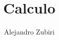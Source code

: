 \documentclass{report}
\author{Alejandro Zubiri}
\title{Calculo}
\begin{document}
\maketitle
\tableofcontents
\pagebreak




\end{document}

